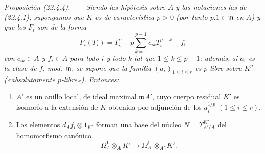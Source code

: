 \documentclass[10pt,oneside]{book}
\makeatletter
\newcommand{\setmanualcurrentlabel}[1]{\def\@currentlabel{#1}}
\newcommand{\oldpage}[2][]{%
  \setcounter{footnote}{0}%
  \marginpar{\scriptsize\textbf{#1}~|~#2}\ignorespaces}
\newenvironment{proposition}[1][]{%
  \setmanualcurrentlabel{#1}\par\medskip\noindent\itshape Proposición (#1). ---\ }{\par}
\providecommand{\setmin}{-}%
\makeatother
\begin{document}
\begin{proposition}[22.4.4]
\label{0.22.4.4-es}
Siendo las hipótesis sobre $A$ y las notaciones las de \textup{(22.4.1)}, supongamos
que $K$ es de característica $p>0$ (por tanto $p.1\in\mathfrak m$ en
$A$) y que los $F_i$ son de la forma
\begin{equation}
\label{0.22.4.4.1-es}
  F_i(T_i)=T_i^p+p\sum_{k=1}^{p-1}c_{ik}T_i^{p-k}\setmin f_{\boldsymbol{i}}
  \tag{22.4.4.1}
\end{equation}
con $c_{ik}\in A$ y $f_i\in A$ para todo $i$ y todo $k$ tal que
$1\leqslant k\leqslant p\setmin 1$; además, si $a_{\boldsymbol i}$ es la clase de $f_i$
\textup{mod.}~$\mathfrak m$, se supone que la familia $(a_i)_{1\leqslant i\leqslant r}$
es $p$-libre sobre $K^p$ \textup{(«absolutamente $p$-libre»)}. Entonces:
\begin{enumerate}
  \item[\textup{(i)}] $A'$ es un anillo local, de ideal maximal $\mathfrak mA'$,
  cuyo cuerpo residual $K'$ es isomorfo a la extensión de $K$ obtenida por
  adjunción de los $a_i^{1/p}$ $(1\leqslant i\leqslant r)$.

  \oldpage[0\textsubscript{IV-1}]{195}

  \item[\textup{(ii)}] Los elementos $d_Af_i\otimes1_{K'}$ forman una base del núcleo
  $N=\Upsilon^{K'}_{A'/A}$ del homomorfismo canónico
  \[
    \Omega^1_A\otimes_AK'\longrightarrow
    \Omega^1_{A'}\otimes_{A'}K'.
  \]
\end{enumerate}
\end{proposition}
\end{document}
